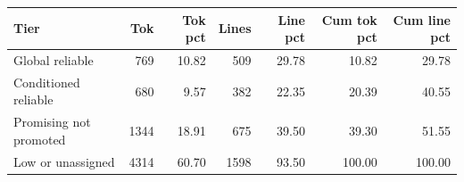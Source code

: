 \begin{tabular}{lrrrrrr}
\toprule
Tier & Tok & Tok pct & Lines & Line pct & Cum tok pct & Cum line pct \\
\midrule
Global reliable & 769 & 10.82 & 509 & 29.78 & 10.82 & 29.78 \\
Conditioned reliable & 680 & 9.57 & 382 & 22.35 & 20.39 & 40.55 \\
Promising not promoted & 1344 & 18.91 & 675 & 39.50 & 39.30 & 51.55 \\
Low or unassigned & 4314 & 60.70 & 1598 & 93.50 & 100.00 & 100.00 \\
\bottomrule
\end{tabular}

